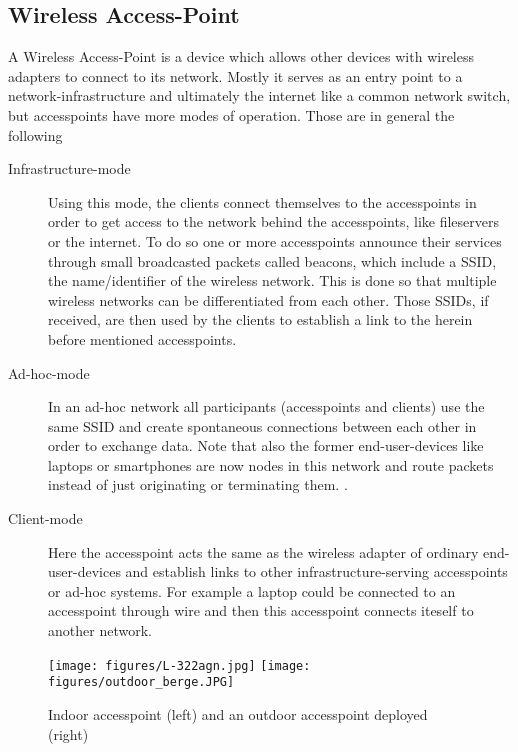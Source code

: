   \subsection{Wireless Access-Point}
    A Wireless Access-Point is a device which allows other devices with wireless adapters to connect to its network.
    Mostly it serves as an entry point to a network-infrastructure and ultimately the internet like a common network switch, 
    but accesspoints have more modes of operation. Those are in general the following
    \begin{description}
      \item[Infrastructure-mode]
	Using this mode, the clients connect themselves to the accesspoints in order to get access to the network behind the accesspoints, like fileservers or the internet.
	To do so one or more accesspoints announce their services through small broadcasted packets called beacons, which include a \ac{SSID}, 
	the name/identifier of the wireless network. This is done 
	so that multiple wireless networks can be differentiated from each other. Those SSIDs, if received, are then used by the clients to
	establish a link to the herein before mentioned accesspoints.
      \item [Ad-hoc-mode]
	In an ad-hoc network all participants (accesspoints and clients) use the same \ac{SSID} and create spontaneous connections between each other in order to 
	exchange data. Note that also the former end-user-devices like laptops or smartphones are now nodes in this network and route packets instead of just originating or
	terminating them. \cite{Akyildiz2005445}.
     \item [Client-mode]
	Here the accesspoint acts the same as the wireless adapter of ordinary end-user-devices and establish links to other infrastructure-serving accesspoints or 
	ad-hoc systems. For example a laptop could be connected to an accesspoint through wire and then this accesspoint connects iteself to another network.
    \end{description}
    
    \begin{figure}[h!]
      \centerline{
	\texttt{[image: figures/L-322agn.jpg]}
	\texttt{[image: figures/outdoor\_berge.JPG]}
      }
      \caption{Indoor accesspoint (left) and an outdoor accesspoint deployed (right) \cite{lancom}}
      \label{fig:L-322agn}
    \end{figure}
     
